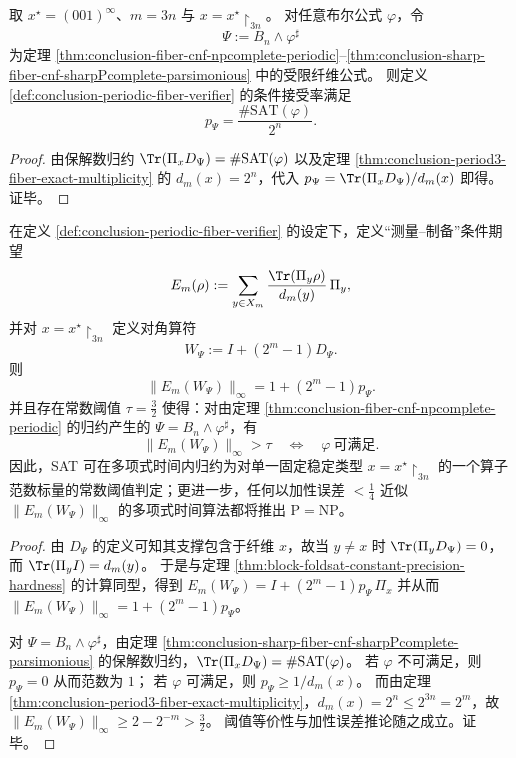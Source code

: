 \begin{theorem}\label{thm:conclusion-periodic-fiber-acceptance-rate-normalized-sharpsat}
取 \(x^\star=(001)^\infty\)、\(m=3n\) 与 \(x=x^\star\!\upharpoonright_{3n}\)。
对任意布尔公式 \(\varphi\)，令
\[
\Psi:=B_n\wedge \varphi^\sharp
\]
为定理 \ref{thm:conclusion-fiber-cnf-npcomplete-periodic}--\ref{thm:conclusion-sharp-fiber-cnf-sharpPcomplete-parsimonious} 中的受限纤维公式。
则定义 \ref{def:conclusion-periodic-fiber-verifier} 的条件接受率满足
\[
p_\Psi=\frac{\#\mathrm{SAT}(\varphi)}{2^n}.
\]
\end{theorem}
\begin{proof}
由保解数归约
\(
\Tr(\Pi_xD_\Psi)=\#\mathrm{SAT}(\varphi)
\)
以及定理 \ref{thm:conclusion-period3-fiber-exact-multiplicity} 的
\(
d_m(x)=2^n
\)，代入
\(
p_\Psi=\Tr(\Pi_xD_\Psi)/d_m(x)
\)
即得。证毕。
\end{proof}

\begin{theorem}[固定周期稳定类型上的常数阈值可满足性判别]\label{thm:conclusion-periodic-fiber-constant-threshold-np-hard}
在定义 \ref{def:conclusion-periodic-fiber-verifier} 的设定下，定义“测量--制备”条件期望
\[
E_m(\rho):=\sum_{y\in X_m}\frac{\Tr(\Pi_y\rho)}{d_m(y)}\,\Pi_y,
\]
并对 \(x=x^\star\!\upharpoonright_{3n}\) 定义对角算符
\[
W_\Psi:=I+(2^{m}-1)D_\Psi.
\]
则
\[
\|E_m(W_\Psi)\|_{\infty}=1+(2^{m}-1)p_\Psi.
\]
并且存在常数阈值 \(\tau=\tfrac32\) 使得：对由定理 \ref{thm:conclusion-fiber-cnf-npcomplete-periodic} 的归约产生的 \(\Psi=B_n\wedge\varphi^\sharp\)，有
\[
\|E_m(W_\Psi)\|_{\infty}>\tau
\quad\Longleftrightarrow\quad
\varphi\ \text{可满足}.
\]
因此，SAT 可在多项式时间内归约为对单一固定稳定类型 \(x=x^\star\!\upharpoonright_{3n}\) 的一个算子范数标量的常数阈值判定；更进一步，任何以加性误差 \(<\tfrac14\) 近似 \(\|E_m(W_\Psi)\|_\infty\) 的多项式时间算法都将推出 \(\mathrm{P}=\mathrm{NP}\)。
\end{theorem}

\begin{proof}
由 \(D_\Psi\) 的定义可知其支撑包含于纤维 \(x\)，故当 \(y\neq x\) 时 \(\Tr(\Pi_yD_\Psi)=0\)，而 \(\Tr(\Pi_yI)=d_m(y)\)。
于是与定理 \ref{thm:block-foldsat-constant-precision-hardness} 的计算同型，得到
\(
E_m(W_\Psi)=I+(2^m-1)p_\Psi\,\Pi_x
\)
并从而 \(\|E_m(W_\Psi)\|_\infty=1+(2^m-1)p_\Psi\)。
\par
对 \(\Psi=B_n\wedge\varphi^\sharp\)，由定理 \ref{thm:conclusion-sharp-fiber-cnf-sharpPcomplete-parsimonious} 的保解数归约，\(\Tr(\Pi_xD_\Psi)=\#\mathrm{SAT}(\varphi)\)。
若 \(\varphi\) 不可满足，则 \(p_\Psi=0\) 从而范数为 \(1\)；
若 \(\varphi\) 可满足，则 \(p_\Psi\ge 1/d_m(x)\)。
而由定理 \ref{thm:conclusion-period3-fiber-exact-multiplicity}，\(d_m(x)=2^n\le 2^{3n}=2^m\)，故
\(
\|E_m(W_\Psi)\|_\infty\ge 2-2^{-m}>\tfrac32
\)。
阈值等价性与加性误差推论随之成立。证毕。
\end{proof}

